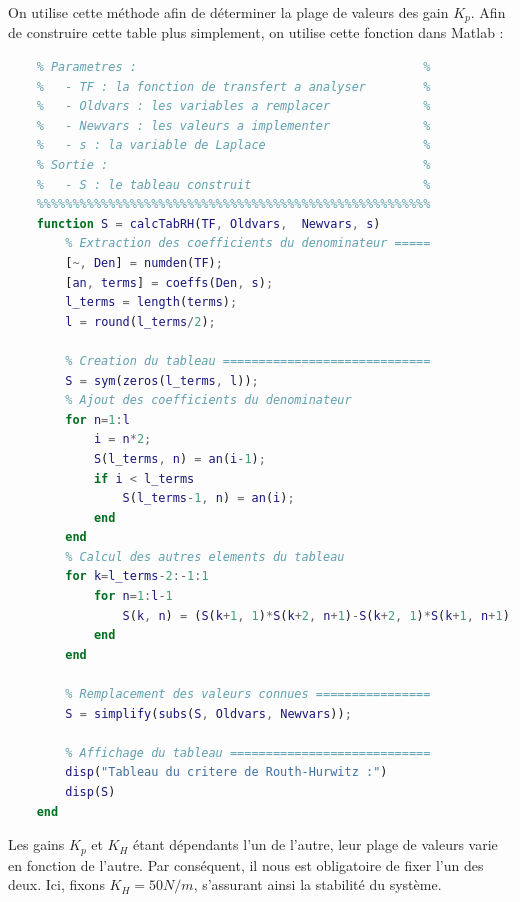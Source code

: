 \documentclass[a4paper,12pt]{article}
\begin{document}
    On utilise cette méthode afin de déterminer la plage de valeurs des gain $K_p$. Afin de construire cette table plus simplement, on utilise cette fonction dans Matlab : \\
    \begin{lstlisting}[label={code:fctCritRH}, caption={Fonction Matlab génération du critère de Routh-Hurwitz}, language=Matlab]
    %%%%%%%%%%%%%%%%%%%%%%%%%%%%%%%%%%%%%%%%%%%%%%%%%%%%%%%
    % Parametres :                                        %
    %   - TF : la fonction de transfert a analyser        %
    %   - Oldvars : les variables a remplacer             %
    %   - Newvars : les valeurs a implementer             %
    %   - s : la variable de Laplace                      %
    % Sortie :                                            %
    %   - S : le tableau construit                        %
    %%%%%%%%%%%%%%%%%%%%%%%%%%%%%%%%%%%%%%%%%%%%%%%%%%%%%%%
    function S = calcTabRH(TF, Oldvars,  Newvars, s)
        % Extraction des coefficients du denominateur =====
        [~, Den] = numden(TF);
        [an, terms] = coeffs(Den, s);
        l_terms = length(terms);
        l = round(l_terms/2);

        % Creation du tableau =============================
        S = sym(zeros(l_terms, l));
        % Ajout des coefficients du denominateur
        for n=1:l
            i = n*2;
            S(l_terms, n) = an(i-1);
            if i < l_terms
                S(l_terms-1, n) = an(i);
            end
        end
        % Calcul des autres elements du tableau
        for k=l_terms-2:-1:1
            for n=1:l-1
                S(k, n) = (S(k+1, 1)*S(k+2, n+1)-S(k+2, 1)*S(k+1, n+1))/S(k+1, 1);
            end
        end

        % Remplacement des valeurs connues ================
        S = simplify(subs(S, Oldvars, Newvars));

        % Affichage du tableau ============================
        disp("Tableau du critere de Routh-Hurwitz :")
        disp(S)
    end
    \end{lstlisting}

    Les gains $K_p$ et $K_H$ étant dépendants l'un de l'autre, leur plage de valeurs varie en fonction de l'autre. Par conséquent, il nous est obligatoire de fixer l'un des deux. Ici, fixons $K_H = 50 N/m$, s'assurant ainsi la stabilité du système.
    
\end{document}
